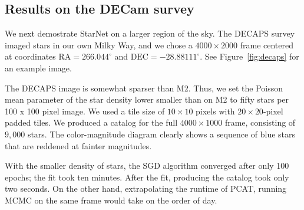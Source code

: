 \subsection{Results on the DECam survey}
\label{sec:results_on_decam}

We next demostrate StarNet on a larger region of the sky.
The DECAPS survey imaged stars in our own Milky Way, and we chose
a $4000 \times 2000$ frame centered at coordinates $\text{RA} = 266.044^\circ$ and
$\text{DEC} = -28.88111^\circ$. See Figure~\ref{fig:decaps} for an example image.

The DECAPS image is somewhat sparser than M2.
Thus, we set the Poisson mean parameter of the star density lower smaller than on M2 to fifty stars per 100 x 100 pixel image.
We used a tile size of $10\times 10$ pixels with $20\times20$-pixel
padded tiles. 
We produced
a catalog for the full $4000 \times 1000$ frame, consisting of $9,000$ stars. 
The color-magnitude diagram clearly shows a sequence of blue
stars that are reddened at fainter magnitudes. 

With the smaller density of stars, 
the SGD algorithm converged after only 100 epochs; 
the fit took ten minutes. After the fit, producing the catalog 
took only two seconds. 
On the other hand, extrapolating the runtime of PCAT, running MCMC on the same frame
would take on the order of day.


